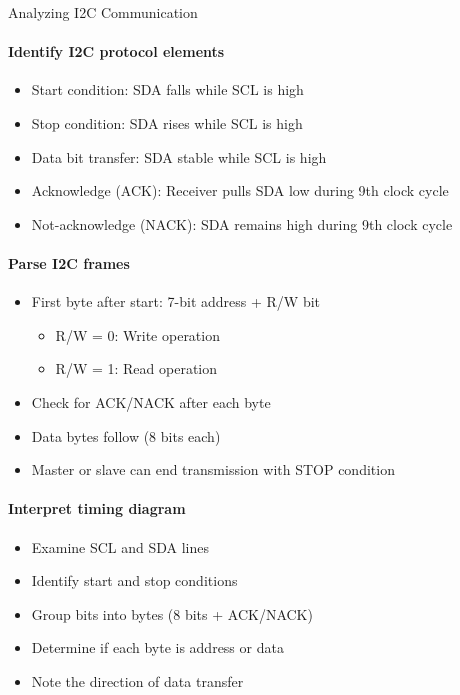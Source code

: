 \begin{KR}{Analyzing I2C Communication}
\paragraph{Identify I2C protocol elements}
\begin{itemize}
    \item Start condition: SDA falls while SCL is high
    \item Stop condition: SDA rises while SCL is high
    \item Data bit transfer: SDA stable while SCL is high
    \item Acknowledge (ACK): Receiver pulls SDA low during 9th clock cycle
    \item Not-acknowledge (NACK): SDA remains high during 9th clock cycle
\end{itemize}

\paragraph{Parse I2C frames}
\begin{itemize}
    \item First byte after start: 7-bit address + R/W bit
    \begin{itemize}
        \item R/W = 0: Write operation
        \item R/W = 1: Read operation
    \end{itemize}
    \item Check for ACK/NACK after each byte
    \item Data bytes follow (8 bits each)
    \item Master or slave can end transmission with STOP condition
\end{itemize}

\paragraph{Interpret timing diagram}
\begin{itemize}
    \item Examine SCL and SDA lines
    \item Identify start and stop conditions
    \item Group bits into bytes (8 bits + ACK/NACK)
    \item Determine if each byte is address or data
    \item Note the direction of data transfer
\end{itemize}
\end{KR}

